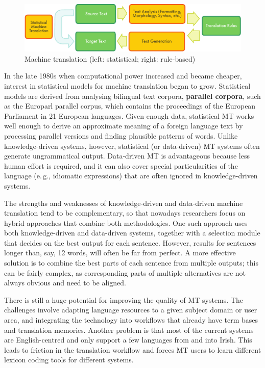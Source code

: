 \documentclass[]{../../metanetpaper}
\begin{document}
\begin{multicols}{2}
\begin{figure}[htb]
  \center
  \includegraphics[width=\textwidth]{../_media/english/machine_translation}
  \caption{Machine translation (left: statistical; right: rule-based)}
  \label{fig:mtarch_en}
\end{figure}

In the late 1980s when computational power increased and became cheaper, interest in statistical models for machine translation began to grow. Statistical models are derived from analysing bilingual text corpora, \textbf{parallel corpora}, such as the Europarl parallel corpus, which contains the proceedings of the European Parliament in 21 European languages. Given enough data, statistical MT works well enough to derive an approximate meaning of a foreign language text by processing parallel versions and finding plausible patterns of words. Unlike knowledge-driven systems, however, statistical (or data-driven) MT systems often generate ungrammatical output. Data-driven MT is advantageous because less human effort is required, and it can also cover special particularities of the language (e.\,g., idiomatic expressions) that are often ignored in knowledge-driven systems. 


The strengths and weaknesses of knowledge-driven and data-driven machine translation tend to be complementary, so that nowadays researchers focus on hybrid approaches that combine both methodologies. One such approach uses both knowledge-driven and data-driven systems, together with a selection module that decides on the best output for each sentence. However, results for sentences longer than, say, 12 words, will often be far from perfect. A more effective solution is to combine the best parts of each sentence from multiple outputs; this can be fairly complex, as corresponding parts of multiple alternatives are not always obvious and need to be aligned. 

There is still a huge potential for improving the quality of MT systems. The challenges involve adapting language resources to a given subject domain or user area, and integrating the technology into workflows that already have term bases and translation memories. Another problem is that most of the current systems are English-centred and only support a few languages from and into Irish. This leads to friction in the translation workflow and forces MT users to learn different lexicon coding tools for different systems.


\end{multicols}
\end{document}
